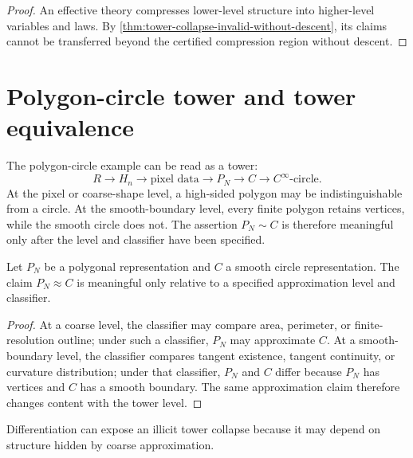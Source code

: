 \begin{proof}
An effective theory compresses lower-level structure into higher-level variables and laws. By \autoref{thm:tower-collapse-invalid-without-descent}, its claims cannot be transferred beyond the certified compression region without descent.
\end{proof}

\section{Polygon-circle tower and tower equivalence}
\label{sec:polygon-circle-tower-equivalence}

The polygon-circle example can be read as a tower:
$$
R
\longrightarrow
H_n
\longrightarrow
\text{pixel data}
\longrightarrow
P_N
\longrightarrow
C
\longrightarrow
C^\infty\text{-circle}.
$$
At the pixel or coarse-shape level, a high-sided polygon may be indistinguishable from a circle. At the smooth-boundary level, every finite polygon retains vertices, while the smooth circle does not. The assertion $P_N\sim C$ is therefore meaningful only after the level and classifier have been specified.

\begin{theorem}
\label{thm:polygonal-approximation-tower-relative}
Let $P_N$ be a polygonal representation and $C$ a smooth circle representation. The claim $P_N\approx C$ is meaningful only relative to a specified approximation level and classifier.
\end{theorem}

\begin{proof}
At a coarse level, the classifier may compare area, perimeter, or finite-resolution outline; under such a classifier, $P_N$ may approximate $C$. At a smooth-boundary level, the classifier compares tangent existence, tangent continuity, or curvature distribution; under that classifier, $P_N$ and $C$ differ because $P_N$ has vertices and $C$ has a smooth boundary. The same approximation claim therefore changes content with the tower level.
\end{proof}

\begin{corollary}
\label{cor:differentiation-detects-tower-collapse}
Differentiation can expose an illicit tower collapse because it may depend on structure hidden by coarse approximation.
\end{corollary}

